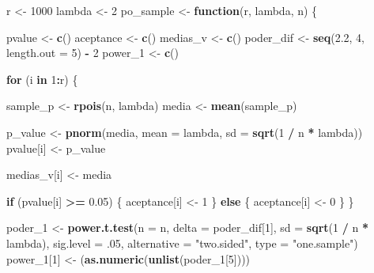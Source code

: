 \documentclass[11pt,]{article}
\newenvironment{Shaded}{\begin{snugshade}}{\end{snugshade}}
\newcommand{\ControlFlowTok}[1]{\textcolor[rgb]{0.13,0.29,0.53}{\textbf{#1}}}
\newcommand{\DataTypeTok}[1]{\textcolor[rgb]{0.13,0.29,0.53}{#1}}
\newcommand{\DecValTok}[1]{\textcolor[rgb]{0.00,0.00,0.81}{#1}}
\newcommand{\FloatTok}[1]{\textcolor[rgb]{0.00,0.00,0.81}{#1}}
\newcommand{\KeywordTok}[1]{\textcolor[rgb]{0.13,0.29,0.53}{\textbf{#1}}}
\newcommand{\NormalTok}[1]{#1}
\newcommand{\OperatorTok}[1]{\textcolor[rgb]{0.81,0.36,0.00}{\textbf{#1}}}
\newcommand{\StringTok}[1]{\textcolor[rgb]{0.31,0.60,0.02}{#1}}
\begin{document}
\begin{Shaded}
\begin{Highlighting}[]
\NormalTok{r <-}\StringTok{ }\DecValTok{1000}
\NormalTok{lambda <-}\StringTok{ }\DecValTok{2}
\NormalTok{po_sample <-}\StringTok{ }\ControlFlowTok{function}\NormalTok{(r, lambda, n) \{}

\NormalTok{  pvalue <-}\StringTok{ }\KeywordTok{c}\NormalTok{()}
\NormalTok{  aceptance <-}\StringTok{ }\KeywordTok{c}\NormalTok{()}
\NormalTok{  medias_v <-}\StringTok{ }\KeywordTok{c}\NormalTok{()}
\NormalTok{  poder_dif <-}\StringTok{ }\KeywordTok{seq}\NormalTok{(}\FloatTok{2.2}\NormalTok{, }\DecValTok{4}\NormalTok{, }\DataTypeTok{length.out =} \DecValTok{5}\NormalTok{) }\OperatorTok{-}\StringTok{ }\DecValTok{2}
\NormalTok{  power_}\DecValTok{1}\NormalTok{ <-}\StringTok{ }\KeywordTok{c}\NormalTok{()}


  \ControlFlowTok{for}\NormalTok{ (i }\ControlFlowTok{in} \DecValTok{1}\OperatorTok{:}\NormalTok{r) \{}

\NormalTok{    sample_p <-}\StringTok{ }\KeywordTok{rpois}\NormalTok{(n, lambda)}
\NormalTok{    media <-}\StringTok{ }\KeywordTok{mean}\NormalTok{(sample_p)}

\NormalTok{    p_value <-}\StringTok{ }\KeywordTok{pnorm}\NormalTok{(media, }\DataTypeTok{mean =}\NormalTok{ lambda, }\DataTypeTok{sd =} \KeywordTok{sqrt}\NormalTok{(}\DecValTok{1} \OperatorTok{/}\StringTok{ }\NormalTok{n }\OperatorTok{*}\StringTok{ }\NormalTok{lambda))}
\NormalTok{    pvalue[i] <-}\StringTok{ }\NormalTok{p_value}

\NormalTok{    medias_v[i] <-}\StringTok{ }\NormalTok{media}

    \ControlFlowTok{if}\NormalTok{ (pvalue[i] }\OperatorTok{>=}\StringTok{ }\FloatTok{0.05}\NormalTok{) \{}
\NormalTok{      aceptance[i] <-}\StringTok{ }\DecValTok{1}
\NormalTok{    \}}
    \ControlFlowTok{else}\NormalTok{ \{}
\NormalTok{      aceptance[i] <-}\StringTok{ }\DecValTok{0}
\NormalTok{    \}}
\NormalTok{  \}}

\NormalTok{  poder_}\DecValTok{1}\NormalTok{ <-}\StringTok{ }\KeywordTok{power.t.test}\NormalTok{(}\DataTypeTok{n =}\NormalTok{ n, }\DataTypeTok{delta =}\NormalTok{ poder_dif[}\DecValTok{1}\NormalTok{],}
                          \DataTypeTok{sd =} \KeywordTok{sqrt}\NormalTok{(}\DecValTok{1} \OperatorTok{/}\StringTok{ }\NormalTok{n }\OperatorTok{*}\StringTok{ }\NormalTok{lambda),}
                          \DataTypeTok{sig.level =} \FloatTok{.05}\NormalTok{,}
                          \DataTypeTok{alternative =} \StringTok{"two.sided"}\NormalTok{,}
                          \DataTypeTok{type =} \StringTok{"one.sample"}\NormalTok{)}
\NormalTok{  power_}\DecValTok{1}\NormalTok{[}\DecValTok{1}\NormalTok{] <-}\StringTok{ }\NormalTok{(}\KeywordTok{as.numeric}\NormalTok{(}\KeywordTok{unlist}\NormalTok{(poder_}\DecValTok{1}\NormalTok{[}\DecValTok{5}\NormalTok{])))}


\end{Highlighting}
\end{Shaded}
\end{document}
